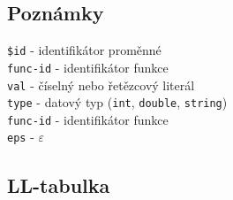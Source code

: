\documentclass[11pt,a4paper]{article}
\renewcommand{\familydefault}{\sfdefault}
\begin{document}
    \subsection*{Poznámky}
        \texttt{\$id} - identifikátor proměnné\\
        \texttt{func-id} - identifikátor funkce\\
        \texttt{val} - číselný nebo řetězcový literál \\
        \texttt{type} - datový typ (\texttt{int}, \texttt{double}, \texttt{string}) \\
        \texttt{func-id} - identifikátor funkce \\
        \texttt{eps} - $\varepsilon$ \\

    \subsection{LL-tabulka}

    \renewcommand{\familydefault}{\ttdefault}
\end{document}

